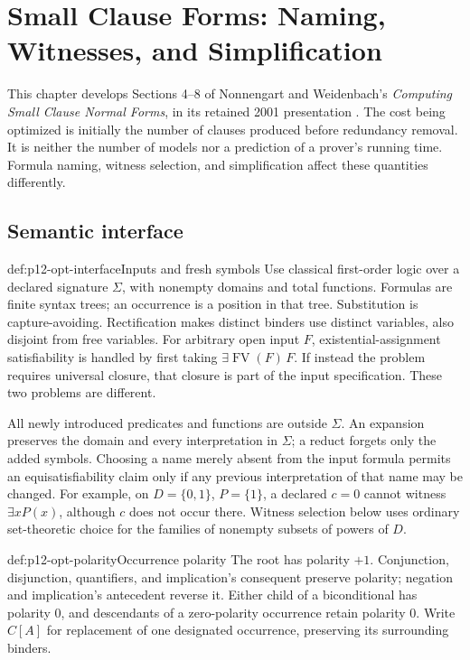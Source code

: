 \chapter{Small Clause Forms: Naming, Witnesses, and Simplification}
\label{sec:p12-opt-small-clauses}

This chapter develops Sections 4--8 of Nonnengart and Weidenbach's
\emph{Computing Small Clause Normal Forms}, in its retained 2001
presentation \cite[pp.~347--365]{NonnengartWeidenbach2001SmallClauses}.
The cost being optimized is initially the number of clauses produced
before redundancy removal. It is neither the number of models nor a
prediction of a prover's running time. Formula naming, witness selection,
and simplification affect these quantities differently.

\section{Semantic interface}
\begin{hbdefinition}{def:p12-opt-interface}{Inputs and fresh symbols}
Use classical first-order logic over a declared signature \(\Sigma\),
with nonempty domains and total functions. Formulas are finite syntax
trees; an occurrence is a position in that tree. Substitution is
capture-avoiding. Rectification makes distinct binders use distinct
variables, also disjoint from free variables.
For arbitrary open input \(F\), existential-assignment satisfiability is
handled by first taking \(\exists\operatorname{FV}(F)\,F\).
If instead the problem requires universal closure, that closure is
part of the input specification. These two problems are different.

All newly introduced predicates and functions are outside \(\Sigma\).
An expansion preserves the domain and every interpretation in \(\Sigma\);
a reduct forgets only the added symbols. Choosing a name merely absent
from the input formula permits an equisatisfiability claim only if any
previous interpretation of that name may be changed.
For example, on \(D=\{0,1\}\), \(P=\{1\}\), a declared \(c=0\)
cannot witness \(\exists xP(x)\), although \(c\) does not occur there.
Witness selection below uses ordinary set-theoretic choice for the
families of nonempty subsets of powers of \(D\).
\end{hbdefinition}

\begin{hbdefinition}{def:p12-opt-polarity}{Occurrence polarity}
The root has polarity \(+1\). Conjunction, disjunction, quantifiers,
and implication's consequent preserve polarity; negation and
implication's antecedent reverse it. Either child of a biconditional
has polarity \(0\), and descendants of a zero-polarity occurrence
retain polarity \(0\). Write \(C[A]\) for replacement of one designated
occurrence, preserving its surrounding binders.
\end{hbdefinition}

